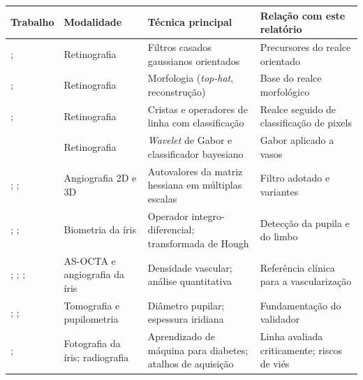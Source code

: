 \documentclass[12pt, oneside, a4paper, chapter=TITLE, section=TITLE,
               english, brazil]{abntex2}
\newcommand{\tht}{\emph{top-hat}}
\begin{document}
\begin{quadro}[htbp]
  \caption{Síntese dos trabalhos relacionados e de sua relação com este
  relatório}
  \label{qua:relacionados}
  \footnotesize
  \renewcommand{\arraystretch}{1.15}
  \begin{tabular}{|>{\raggedright\arraybackslash}p{3.5cm}
                  |>{\raggedright\arraybackslash}p{2.3cm}
                  |>{\raggedright\arraybackslash}p{3.9cm}
                  |>{\raggedright\arraybackslash}p{4.0cm}|}
    \hline
    \textbf{Trabalho} & \textbf{Modalidade} & \textbf{Técnica principal} &
      \textbf{Relação com este relatório} \\ \hline
    \citet{Chaudhuri1989}; \citet{Hoover2000} & Retinografia &
      Filtros casados gaussianos orientados & Precursores do realce
      orientado \\ \hline
    \citet{ZanaKlein2001}; \citet{Mendonca2006} & Retinografia &
      Morfologia (\tht{}, reconstrução) & Base do realce morfológico \\ \hline
    \citet{Staal2004}; \citet{RicciPerfetti2007} & Retinografia &
      Cristas e operadores de linha com classificação & Realce seguido de
      classificação de pixels \\ \hline
    \citet{Soares2006} & Retinografia & \emph{Wavelet} de Gabor e
      classificador bayesiano & Gabor aplicado a vasos \\ \hline
    \citet{Frangi1998}; \citet{Sato1998}; \citet{Jerman2016} &
      Angiografia 2D e 3D & Autovalores da matriz hessiana em múltiplas
      escalas & Filtro adotado e variantes \\ \hline
    \citet{Daugman2004}; \citet{Wildes1997}; \citet{Bowyer2008} &
      Biometria da íris & Operador integro-diferencial; transformada de
      Hough & Detecção da pupila e do limbo \\ \hline
    \citet{Roberts2017}; \citet{Zett2018}; \citet{Zhou2025};
      \citet{Zhu2026} & AS-OCTA e angiografia da íris & Densidade vascular;
      análise quantitativa & Referência clínica para a vascularização \\ \hline
    \citet{Cui2024}; \citet{Thakar2025}; \citet{Surya2026} & Tomografia e
      pupilometria & Diâmetro pupilar; espessura iridiana & Fundamentação do
      validador \\ \hline
    \citet{SamantAgarwal2018}; \citet{Zech2018} & Fotografia da íris;
      radiografia & Aprendizado de máquina para diabetes; atalhos de
      aquisição & Linha avaliada criticamente; riscos de viés \\ \hline
  \end{tabular}
\end{quadro}
\end{document}
